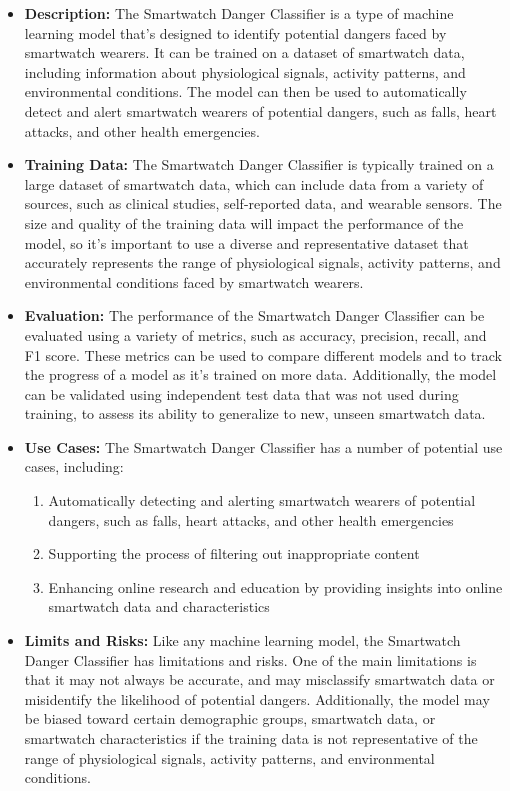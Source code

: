 \begin{itemize}
    \item \textbf{Description:} The Smartwatch Danger Classifier is a type of machine learning model that's designed to identify potential dangers faced by smartwatch wearers. It can be trained on a dataset of smartwatch data, including information about physiological signals, activity patterns, and environmental conditions. The model can then be used to automatically detect and alert smartwatch wearers of potential dangers, such as falls, heart attacks, and other health emergencies.
    \item \textbf{Training Data:} The Smartwatch Danger Classifier is typically trained on a large dataset of smartwatch data, which can include data from a variety of sources, such as clinical studies, self-reported data, and wearable sensors. The size and quality of the training data will impact the performance of the model, so it's important to use a diverse and representative dataset that accurately represents the range of physiological signals, activity patterns, and environmental conditions faced by smartwatch wearers.
    \item \textbf{Evaluation:} The performance of the Smartwatch Danger Classifier can be evaluated using a variety of metrics, such as accuracy, precision, recall, and F1 score. These metrics can be used to compare different models and to track the progress of a model as it's trained on more data. Additionally, the model can be validated using independent test data that was not used during training, to assess its ability to generalize to new, unseen smartwatch data.
    \item \textbf{Use Cases:} The Smartwatch Danger Classifier has a number of potential use cases, including:
        \begin{enumerate}  
            \item Automatically detecting and alerting smartwatch wearers of potential dangers, such as falls, heart attacks, and other health emergencies
            \item Supporting the process of filtering out inappropriate content
            \item Enhancing online research and education by providing insights into online smartwatch data and characteristics
        \end{enumerate}
    \item \textbf{Limits and Risks:} Like any machine learning model, the Smartwatch Danger Classifier has limitations and risks. One of the main limitations is that it may not always be accurate, and may misclassify smartwatch data or misidentify the likelihood of potential dangers. Additionally, the model may be biased toward certain demographic groups, smartwatch data, or smartwatch characteristics if the training data is not representative of the range of physiological signals, activity patterns, and environmental conditions.

\end{itemize}
